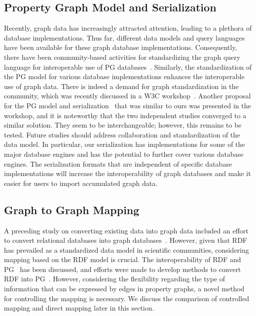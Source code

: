 \documentclass[runningheads]{llncs}
\begin{document}
\subsection{Property Graph Model and Serialization}
Recently, graph data has increasingly attracted attention, leading to a plethora of database implementations. 
Thus far, different data models and query languages have been available for these graph database implementations.
Consequently, there have been community-based activities for standardizing the graph query language for interoperable use of PG databases~\cite{angles3}. Similarly, the standardization of the PG model for various database implementations enhances the interoperable use of graph data. There is indeed a demand for graph standardization in the community, which was recently discussed in a W3C workshop~\cite{w3c}. Another proposal for the PG model and serialization~\cite{tomaszuk} that was similar to ours was presented in the workshop, and it is noteworthy that the two independent studies converged to a similar solution. They seem to be interchangeable; however, this remains to be tested. Future studies should address collaboration and standardization of the data model.
In particular, our serialization has implementations for some of the major database engines and has the potential to further cover various database engines. 
The serialization formats that are independent of specific database implementations will increase the interoperability of graph databases and make it easier for users to import accumulated graph data.

\subsection{Graph to Graph Mapping}
A preceding study on converting existing data into graph data included an effort to convert relational databases into graph databases~\cite{virgilio1}. 
However, given that RDF has prevailed as a standardized data model in scientific communities, considering mapping based on the RDF model is crucial. The interoperability of RDF and PG~\cite{hartig,angles4,das,thakkar} has been discussed, and efforts were made to develop methods to convert RDF into PG~\cite{tomaszuk1,virgilio}. However, considering the flexibility regarding the type of information that can be expressed by edges in property graphs, a novel method for controlling the mapping is necessary.
We discuss the comparison of controlled mapping and direct mapping later in this section.
\end{document}
